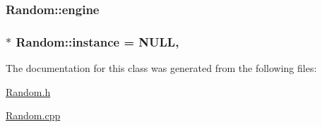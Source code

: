 \subsubsection[{engine}]{ Random\+::engine\hspace{0.3cm}{\ttfamily [private]}}\label{classRandom_a273901a5b482668a1a0204b8691317e1}
\hypertarget{classRandom_a841a26400e4205f27cfb1ab4acaccb46}{}
\subsubsection[{instance}]{ $\ast$ Random\+::instance = N\+U\+L\+L\hspace{0.3cm}{\ttfamily [static]}, {\ttfamily [private]}}\label{classRandom_a841a26400e4205f27cfb1ab4acaccb46}


The documentation for this class was generated from the following files\+:\begin{DoxyCompactItemize}
\item 
\hyperlink{Random_8h}{Random.\+h}\item 
\hyperlink{Random_8cpp}{Random.\+cpp}\end{DoxyCompactItemize}
